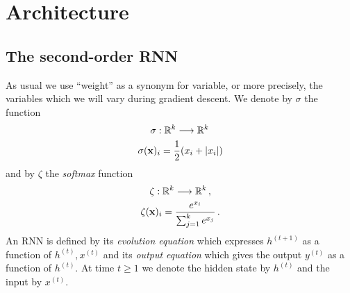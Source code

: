 \documentclass[english,letter paper,12pt,leqno]{article}
\theoremstyle{example}
\numberwithin{equation}{section}
\begin{document}




\section{Architecture}

\subsection{The second-order RNN}

As usual we use ``weight'' as a synonym for variable, or more precisely, the variables which we will vary during gradient descent. We denote by $\sigma$ the function
\begin{gather*}
\sigma: \mathbb{R}^k \longrightarrow \mathbb{R}^k\,\\
\sigma( \bold{x} )_i = \frac{1}{2}( x_i + |x_i| )
\end{gather*}
and by $\zeta$ the \emph{softmax} function
\begin{gather*}
\zeta: \mathbb{R}^k \longrightarrow \mathbb{R}^k\,,\\
\zeta(\bold{x})_i = \frac{e^{x_i}}{\sum_{j=1}^k e^{x_j}}\,.
\end{gather*}
An RNN is defined by its \emph{evolution equation} which expresses $h^{(t+1)}$ as a function of $h^{(t)}, x^{(t)}$ and its \emph{output equation} which gives the output $y^{(t)}$ as a function of $h^{(t)}$. At time $t \ge 1$ we denote the hidden state by $h^{(t)}$ and the input by $x^{(t)}$. 
\end{document}
